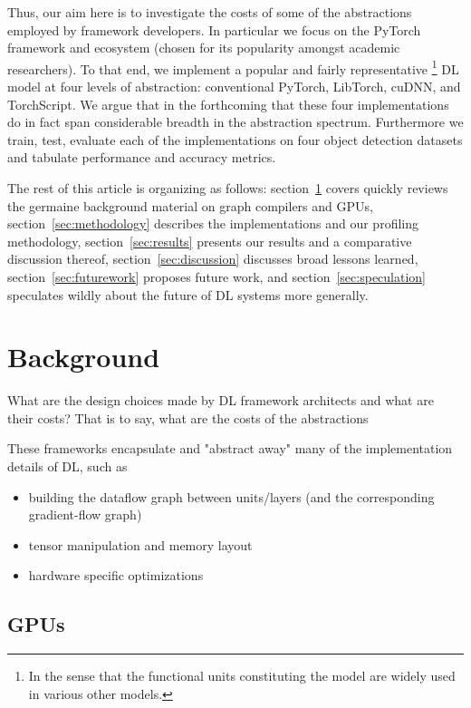 \documentclass[sigconf]{acmart}
\begin{document}
Thus, our aim here is to investigate the costs of some of the abstractions employed by framework developers.
In particular we focus on the PyTorch framework and ecosystem (chosen for its popularity amongst academic researchers).
To that end, we implement a popular and fairly representative%
\footnote{In the sense that the functional units constituting the model are widely used in various other models.}
DL model at four levels of abstraction: conventional PyTorch, LibTorch, cuDNN, and TorchScript.
We argue that in the forthcoming that these four implementations do in fact span considerable breadth in the abstraction spectrum.
Furthermore we train, test, evaluate each of the implementations on four object detection datasets and tabulate performance and accuracy metrics.

The rest of this article is organizing as follows: section~\ref{sec:background} covers quickly reviews the germaine background material on graph compilers and GPUs, section~\ref{sec:methodology} describes the implementations and our profiling methodology, section~\ref{sec:results} presents our results and a comparative discussion thereof, section~\ref{sec:discussion} discusses broad lessons learned, section~\ref{sec:futurework} proposes future work, and section~\ref{sec:speculation} speculates wildly about the future of DL systems more generally.


\section{Background}\label{sec:background}
What are the design choices made by DL framework architects and what are their costs?
That is to say, what are the costs of the abstractions

These frameworks encapsulate and "abstract away" many of the implementation details of DL, such as
\begin{itemize}
  \item building the dataflow graph between units/layers (and the corresponding gradient-flow graph)
  \item tensor manipulation and memory layout
  \item hardware specific optimizations
\end{itemize}

\subsection{GPUs}\label{subsec:gpus}
\end{document}
